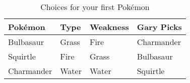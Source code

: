 \begin{table}[ht]
\centering
\begin{tabular}{llll}
  \toprule
Pok\'emon & Type & Weakness & Gary Picks \\ 
  \midrule
Bulbasaur & Grass & Fire & Charmander \\ 
  Squirtle & Fire & Grass & Bulbasaur \\ 
  Charmander & Water & Water & Squirtle \\ 
   \bottomrule
\end{tabular}
\caption{Choices for your first Pok\'emon} 
\label{tab:first-pm}
\end{table}

